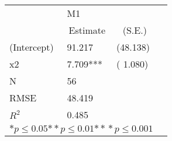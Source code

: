 \begin{tabular}{@{}l*{3}{l}@{}}
\hline
  &\multicolumn{2}{l}{M1  }\tabularnewline
 &\multicolumn{1}{c}{Estimate}&\multicolumn{1}{c}{(S.E.)}\tabularnewline
 \hline
 \hline
  (Intercept) & 91.217 & (48.138) \tabularnewline
  x2 & 7.709*** & ( 1.080) \tabularnewline
 \hline
 N&\multicolumn{1}{l}{56}  & \tabularnewline
 RMSE&48.419\tabularnewline
 $R^2$&0.485\tabularnewline
 \hline
\hline
 
 \multicolumn{3}{l}{  ${*  p}\le 0.05$${*\!\!*  p}\le 0.01$${*\!\!*\!\!*  p}\le 0.001$}\tabularnewline
 \end{tabular}